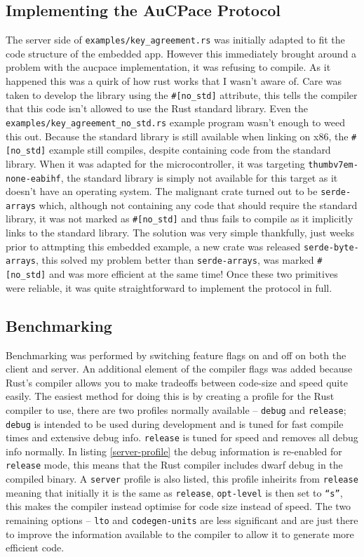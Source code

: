 \subsection{Implementing the AuCPace Protocol}
The server side of \texttt{examples/key\_agreement.rs} was initially adapted to fit the code structure of the embedded app.
However this immediately brought around a problem with the \gls{aucpace} implementation, it was refusing to compile.
As it happened this was a quirk of how rust works that I wasn't aware of.
Care was taken to develop the library using the \verb|#[no_std]| attribute, this tells the compiler that this code isn't allowed to use the Rust standard library.
Even the \texttt{examples/key\_agreement\_no\_std.rs} example program wasn't enough to weed this out.
Because the standard library is still available when linking on x86, the \verb|#[no_std]| example still compiles, despite containing code from the standard library.
When it was adapted for the microcontroller, it was targeting \texttt{thumbv7em-none-eabihf}, the standard library is simply not available for this target as it doesn't have an operating system.
The malignant crate turned out to be \texttt{serde-arrays} which, although not containing any code that should require the standard library, it was not marked as \verb|#[no_std]| and thus fails to compile as it implicitly links to the standard library.
The solution was very simple thankfully, just weeks prior to attmpting this embedded example, a new crate was released \texttt{serde-byte-arrays}, this solved my problem better than \texttt{serde-arrays}, was marked \verb|#[no_std]| and was more efficient at the same time!
Once these two primitives were reliable, it was quite straightforward to implement the protocol in full.

\subsection{Benchmarking}
Benchmarking was performed by switching feature flags on and off on both the client and server.
An additional element of the compiler flags was added because Rust's compiler allows you to make tradeoffs between code-size and speed quite easily.
The easiest method for doing this is by creating a profile for the Rust compiler to use, there are two profiles normally available -- \texttt{debug} and \texttt{release}; \texttt{debug} is intended to be used during development and is tuned for fast compile times and extensive debug info. \texttt{release} is tuned for speed and removes all debug info normally.
In listing \ref{server-profile} the debug information is re-enabled for \texttt{release} mode, this means that the Rust compiler includes \gls{dwarf} debug in the compiled binary.
A \texttt{server} profile is also listed, this profile inheirits from \texttt{release} meaning that initially it is the same as \texttt{release}, \texttt{opt-level} is then set to \texttt{\enquote{s}}, this makes the compiler instead optimise for code size instead of speed.
The two remaining options -- \texttt{lto} and \texttt{codegen-units} are less significant and are just there to improve the information available to the compiler to allow it to generate more efficient code.


